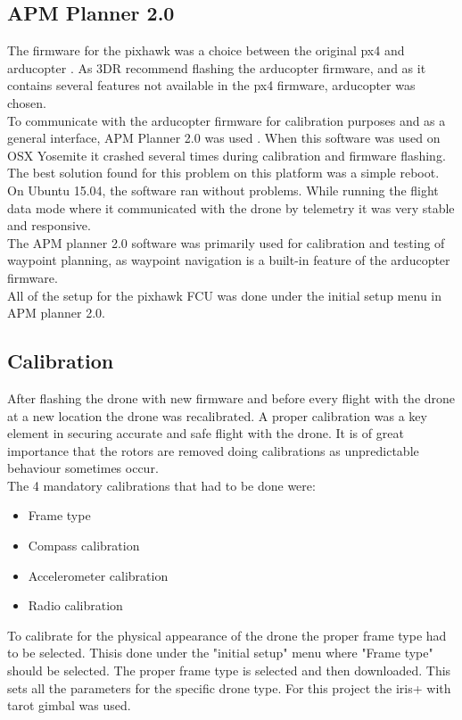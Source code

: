 \subsection*{APM Planner 2.0}
The firmware for the pixhawk was a choice between the original px4 and arducopter
\cite{Ref:Arducopter}. As 3DR recommend flashing the arducopter firmware, and as it contains several
features not available in the px4 firmware, arducopter was chosen.\\
To communicate with the arducopter firmware for calibration purposes and as a general interface,
APM Planner 2.0 was used \cite{Ref:APM2}.
When this software was used on OSX Yosemite it crashed several times
during calibration and firmware flashing. The best solution found for this problem on this platform
was a simple reboot. On Ubuntu 15.04, the software ran without problems.
While running the flight data mode where it communicated with the drone by
telemetry it was very stable and responsive.\\
The APM planner 2.0 software was primarily used for calibration and testing of waypoint planning,
as waypoint navigation is a built-in feature of the arducopter firmware.\\
All of the setup for the pixhawk FCU was done under the initial setup menu in APM planner 2.0.

\subsection*{Calibration}

After flashing the drone with new firmware and before every flight with the drone at a new location
the drone was recalibrated. A proper calibration was a key element in securing accurate and safe
flight with the drone. It is of great importance that the rotors are removed doing calibrations as
unpredictable behaviour sometimes occur.\\
The 4 mandatory calibrations that had to be done were:
\begin{itemize}
\item Frame type
\item Compass calibration
\item Accelerometer calibration
\item Radio calibration
\end{itemize}

To calibrate for the physical appearance of the drone the proper frame type had to be selected.
Thisis done under the "initial setup" menu where "Frame type" should be selected. The proper frame
type
is selected and then downloaded. This sets all the parameters for the specific drone type. For this
project the iris+ with tarot gimbal was used.\\

